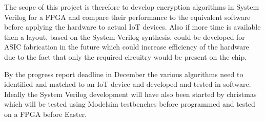 \documentclass[12pt]{article}
\begin{document}
   The scope of this project is therefore to develop encryption algorithms in System Verilog for a FPGA and compare their performance to the equivalent software before applying the hardware to actual IoT devices. Also if more time is available then a layout, based on the System Verilog synthesis, could be developed for ASIC fabrication in the future which could increase efficiency of the hardware due to the fact that only the required circuitry would be present on the chip.
   
   By the progress report deadline in December the various algorithms need to identified and matched to an IoT device and developed and tested in software. Ideally the System Verilog development will have also been started by christmas which will be tested using Modelsim testbenches before programmed and tested on a FPGA before Easter.
\end{document}
